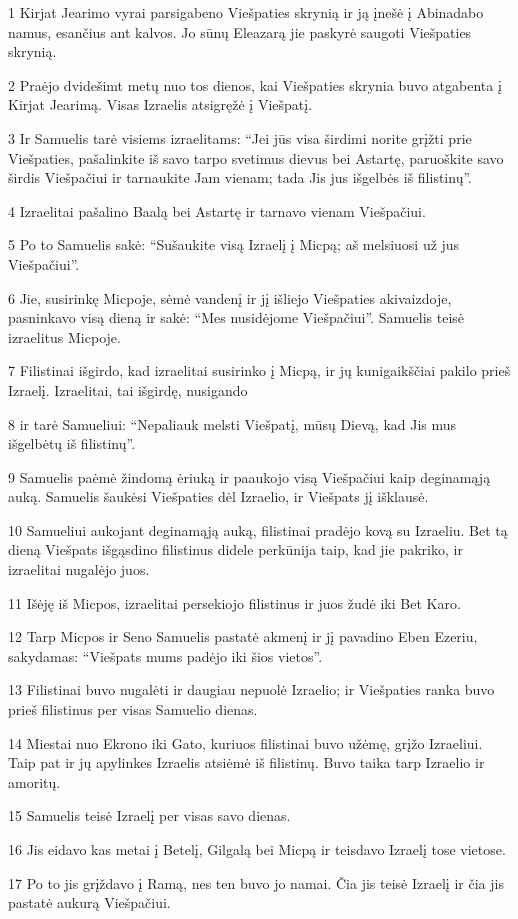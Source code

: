 \par 1 Kirjat Jearimo vyrai parsigabeno Viešpaties skrynią ir ją įnešė į Abinadabo namus, esančius ant kalvos. Jo sūnų Eleazarą jie paskyrė saugoti Viešpaties skrynią. 
\par 2 Praėjo dvidešimt metų nuo tos dienos, kai Viešpaties skrynia buvo atgabenta į Kirjat Jearimą. Visas Izraelis atsigręžė į Viešpatį. 
\par 3 Ir Samuelis tarė visiems izraelitams: “Jei jūs visa širdimi norite grįžti prie Viešpaties, pašalinkite iš savo tarpo svetimus dievus bei Astartę, paruoškite savo širdis Viešpačiui ir tarnaukite Jam vienam; tada Jis jus išgelbės iš filistinų”. 
\par 4 Izraelitai pašalino Baalą bei Astartę ir tarnavo vienam Viešpačiui. 
\par 5 Po to Samuelis sakė: “Sušaukite visą Izraelį į Micpą; aš melsiuosi už jus Viešpačiui”. 
\par 6 Jie, susirinkę Micpoje, sėmė vandenį ir jį išliejo Viešpaties akivaizdoje, pasninkavo visą dieną ir sakė: “Mes nusidėjome Viešpačiui”. Samuelis teisė izraelitus Micpoje. 
\par 7 Filistinai išgirdo, kad izraelitai susirinko į Micpą, ir jų kunigaikščiai pakilo prieš Izraelį. Izraelitai, tai išgirdę, nusigando 
\par 8 ir tarė Samueliui: “Nepaliauk melsti Viešpatį, mūsų Dievą, kad Jis mus išgelbėtų iš filistinų”. 
\par 9 Samuelis paėmė žindomą ėriuką ir paaukojo visą Viešpačiui kaip deginamąją auką. Samuelis šaukėsi Viešpaties dėl Izraelio, ir Viešpats jį išklausė. 
\par 10 Samueliui aukojant deginamąją auką, filistinai pradėjo kovą su Izraeliu. Bet tą dieną Viešpats išgąsdino filistinus didele perkūnija taip, kad jie pakriko, ir izraelitai nugalėjo juos. 
\par 11 Išėję iš Micpos, izraelitai persekiojo filistinus ir juos žudė iki Bet Karo. 
\par 12 Tarp Micpos ir Seno Samuelis pastatė akmenį ir jį pavadino Eben Ezeriu, sakydamas: “Viešpats mums padėjo iki šios vietos”. 
\par 13 Filistinai buvo nugalėti ir daugiau nepuolė Izraelio; ir Viešpaties ranka buvo prieš filistinus per visas Samuelio dienas. 
\par 14 Miestai nuo Ekrono iki Gato, kuriuos filistinai buvo užėmę, grįžo Izraeliui. Taip pat ir jų apylinkes Izraelis atsiėmė iš filistinų. Buvo taika tarp Izraelio ir amoritų. 
\par 15 Samuelis teisė Izraelį per visas savo dienas. 
\par 16 Jis eidavo kas metai į Betelį, Gilgalą bei Micpą ir teisdavo Izraelį tose vietose. 
\par 17 Po to jis grįždavo į Ramą, nes ten buvo jo namai. Čia jis teisė Izraelį ir čia jis pastatė aukurą Viešpačiui.




